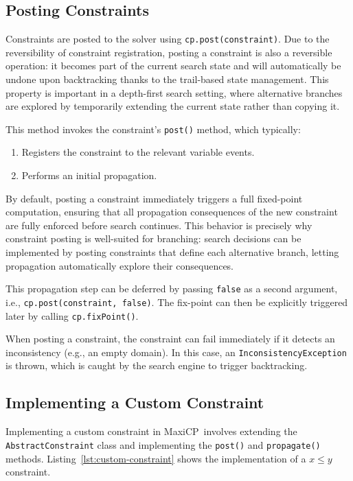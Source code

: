\documentclass[11pt, a4paper]{scrartcl}
\newcommand{\maxicp}{\textsf{MaxiCP}}
\begin{document}
\subsection{Posting Constraints}

Constraints are posted to the solver using \texttt{cp.post(constraint)}.
Due to the reversibility of constraint registration, posting a constraint is also a reversible operation:
it becomes part of the current search state and will automatically be undone upon backtracking thanks to the trail-based state management.
This property is important in a depth-first search setting, where alternative branches are explored by temporarily extending the current state rather than copying it.

This method invokes the constraint's \texttt{post()} method, which typically:
\begin{enumerate}
    \item Registers the constraint to the relevant variable events.
    \item Performs an initial propagation.
\end{enumerate}

By default, posting a constraint immediately triggers a full fixed-point computation,
ensuring that all propagation consequences of the new constraint are fully enforced before search continues.
This behavior is precisely why constraint posting is well-suited for branching:
search decisions can be implemented by posting constraints that define each alternative branch,
letting propagation automatically explore their consequences.

This propagation step can be deferred by passing \texttt{false} as a second argument, i.e., \texttt{cp.post(constraint, false)}.
The fix-point can then be explicitly triggered later by calling \texttt{cp.fixPoint()}.

When posting a constraint, the constraint can fail immediately if it detects an inconsistency (e.g., an empty domain).
In this case, an \texttt{InconsistencyException} is thrown, which is caught by the search engine to trigger backtracking.

\subsection{Implementing a Custom Constraint}

Implementing a custom constraint in \maxicp\ involves extending the \texttt{AbstractConstraint} class and
implementing the \texttt{post()} and \texttt{propagate()} methods.
Listing~\ref{lst:custom-constraint} shows the implementation of a $x \leq y$ constraint.
\end{document}
